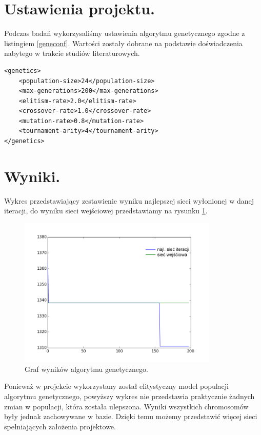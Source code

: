 \documentclass[twoside,12pt]{report}
\begin{document}
\section{Ustawienia projektu.}

Podczas badań wykorzysaliśmy ustawienia algorytmu genetycznego zgodne z listingiem \ref{geneconf}. Wartości zostały dobrane na podstawie doświadczenia nabytego w trakcie studiów literaturowych. 
	
\begin{lstlisting}[caption=Ustawienia algorytmu genetycznego podczas badań.,label=geneconf]
<genetics>
	<population-size>24</population-size>
	<max-generations>200</max-generations>
	<elitism-rate>2.0</elitism-rate>
	<crossover-rate>1.0</crossover-rate>
	<mutation-rate>0.8</mutation-rate>
	<tournament-arity>4</tournament-arity>
</genetics>
\end{lstlisting}

\newpage
\section{Wyniki.}

Wykres przedstawiający zestawienie wyniku najlepszej sieci wyłonionej w danej iteracji, do wyniku sieci wejściowej przedstawiamy na rysunku \ref{def_fitness}.

\begin{figure}[ht]
\centering
\includegraphics[width=0.85\textwidth]{img/fitness}
\caption{Graf wyników algorytmu genetycznego.}
\label{def_fitness}
\end{figure}

Ponieważ w projekcie wykorzystany został elitystyczny model populacji algorytmu genetycznego, powyższy wykres nie przedstawia praktycznie żadnych zmian w populacji, która została ulepszona. Wyniki wszystkich chromosomów były jednak zachowywane w bazie. Dzięki temu możemy przedstawić więcej sieci spełniających założenia projektowe.
\end{document}
